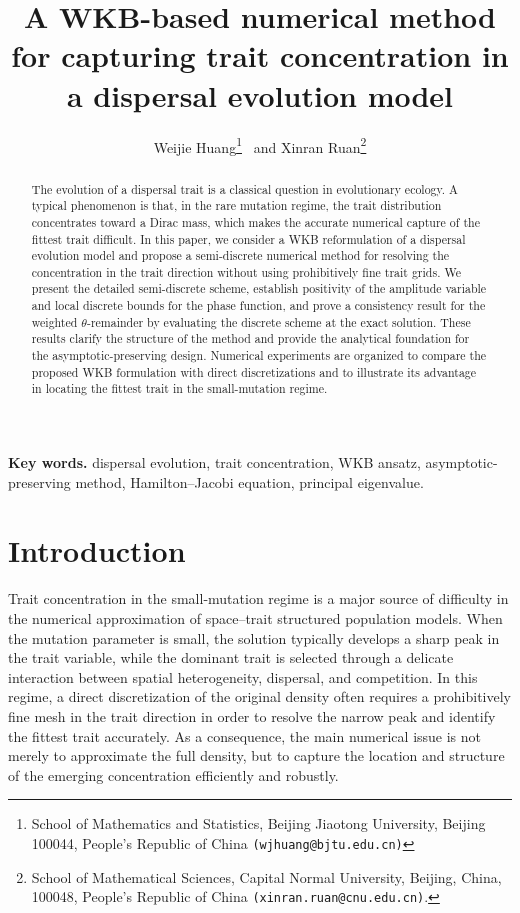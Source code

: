 \documentclass[11pt, dina4, amsfont12]{article}
\title{A WKB-based numerical method for capturing trait concentration in a dispersal evolution model}
\author{
Weijie Huang\thanks{School of Mathematics and Statistics, Beijing Jiaotong University, Beijing 100044, People's Republic of China {\tt (wjhuang@bjtu.edu.cn)}} \ and
Xinran Ruan\thanks{School of Mathematical Sciences, Capital Normal University, Beijing, China, 100048, People's Republic of China {\tt (xinran.ruan@cnu.edu.cn)}.}
}
\begin{document}
\date{}
\maketitle

\begin{abstract}
The evolution of a dispersal trait is a classical question in evolutionary ecology. A typical phenomenon is that, in the rare mutation regime, the trait distribution concentrates toward a Dirac mass, which makes the accurate numerical capture of the fittest trait difficult. In this paper, we consider a WKB reformulation of a dispersal evolution model and propose a semi-discrete numerical method for resolving the concentration in the trait direction without using prohibitively fine trait grids. We present the detailed semi-discrete scheme, establish positivity of the amplitude variable and local discrete bounds for the phase function, and prove a consistency result for the weighted $\theta$-remainder by evaluating the discrete scheme at the exact solution. These results clarify the structure of the method and provide the analytical foundation for the asymptotic-preserving design. Numerical experiments are organized to compare the proposed WKB formulation with direct discretizations and to illustrate its advantage in locating the fittest trait in the small-mutation regime.
\end{abstract}

{\bf Key words. } dispersal evolution, trait concentration, WKB ansatz, asymptotic-preserving method, Hamilton--Jacobi equation, principal eigenvalue.


\section{Introduction}

Trait concentration in the small-mutation regime is a major source of difficulty in the numerical approximation of space--trait structured population models. When the mutation parameter is small, the solution typically develops a sharp peak in the trait variable, while the dominant trait is selected through a delicate interaction between spatial heterogeneity, dispersal, and competition. In this regime, a direct discretization of the original density often requires a prohibitively fine mesh in the trait direction in order to resolve the narrow peak and identify the fittest trait accurately. As a consequence, the main numerical issue is not merely to approximate the full density, but to capture the location and structure of the emerging concentration efficiently and robustly.
\end{document}
